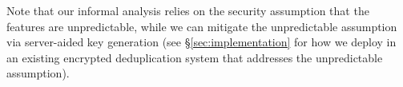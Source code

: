 
Note that our informal analysis relies on the security assumption that the features are unpredictable, while we can mitigate the unpredictable assumption via server-aided key generation \cite{bellare13b} (see \S\ref{sec:implementation} for how we deploy \sysnameF in an existing encrypted deduplication system that addresses the unpredictable assumption).





